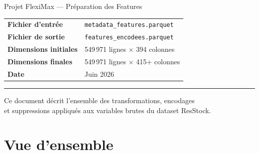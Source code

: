 \documentclass[11pt,a4paper]{article}
\begin{document}

\begin{titlepage}
  \centering
  \vspace*{1.8cm}


  \vspace{0.45cm}
  {\large\color{gray} Projet FlexiMax — Préparation des Features\par}
  \vspace{1.8cm}

  \begin{tabular}{@{}ll@{}}
    \textbf{Fichier d'entrée}     & \texttt{metadata\_features.parquet} \\[5pt]
    \textbf{Fichier de sortie}    & \texttt{features\_encodees.parquet} \\[5pt]
    \textbf{Dimensions initiales} & 549\,971 lignes $\times$ 394 colonnes \\[5pt]
    \textbf{Dimensions finales}   & 549\,971 lignes $\times$ 415+ colonnes \\[5pt]
    \textbf{Date}                 & Juin 2026 \\
  \end{tabular}

  \vspace{1.8cm}
  \rule{15.5cm}{0.4pt}
  \vspace{0.4cm}

  {\normalsize Ce document décrit l'ensemble des transformations, encodages\\
  et suppressions appliqués aux variables brutes du dataset ResStock.}
\end{titlepage}

\tableofcontents
\newpage

\section{Vue d'ensemble}
\end{document}
